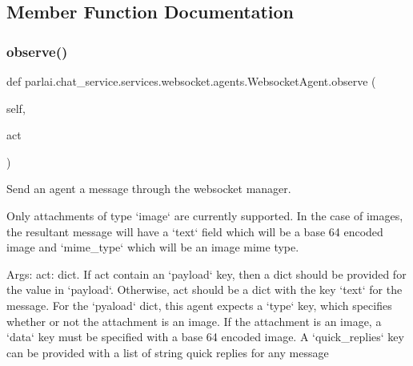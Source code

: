 \subsection{Member Function Documentation}
\mbox{\label{classparlai_1_1chat__service_1_1services_1_1websocket_1_1agents_1_1WebsocketAgent_aae41aaeb0af93fb30a11e731167c596c}} 
\subsubsection{\texorpdfstring{observe()}{observe()}}
{\footnotesize\ttfamily def parlai.\+chat\+\_\+service.\+services.\+websocket.\+agents.\+Websocket\+Agent.\+observe (\begin{DoxyParamCaption}\item[{}]{self,  }\item[{}]{act }\end{DoxyParamCaption})}

\begin{DoxyVerb}Send an agent a message through the websocket manager.

Only attachments of type `image` are currently supported. In the case of
images, the resultant message will have a `text` field which will be a
base 64 encoded image and `mime_type` which will be an image mime type.

Args:
    act: dict. If act contain an `payload` key, then a dict should be
provided for the value in `payload`. Otherwise, act should be
a dict with the key `text` for the message.
For the `pyaload` dict, this agent expects a `type` key, which
specifies whether or not the attachment is an image. If the
attachment is an image, a `data` key must be specified with a
base 64 encoded image.
A `quick_replies` key can be provided with a list of string quick
replies for any message
\end{DoxyVerb}
 \mbox{\label{classparlai_1_1chat__service_1_1services_1_1websocket_1_1agents_1_1WebsocketAgent_a8e6bb97a0b0996be55dd7aacedc62dff}} 
